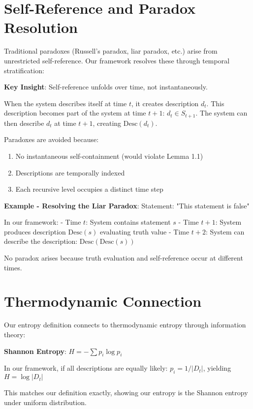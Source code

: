 \section{Self-Reference and Paradox Resolution}
\label{sec:ch01_axiom_and_derivation:self-reference-and-paradox-resolution}

Traditional paradoxes (Russell's paradox, liar paradox, etc.) arise from unrestricted self-reference. Our framework resolves these through temporal stratification:

\textbf{Key Insight}: Self-reference unfolds over time, not instantaneously.

When the system describes itself at time $t$, it creates description $d_t$.
This description becomes part of the system at time $t+1$: $d_t \in S_{t+1}$.
The system can then describe $d_t$ at time $t+1$, creating $\text{Desc}(d_t)$.

Paradoxes are avoided because:
\begin{enumerate}
\item No instantaneous self-containment (would violate Lemma 1.1)
\item Descriptions are temporally indexed
\item Each recursive level occupies a distinct time step
\end{enumerate}

\textbf{Example - Resolving the Liar Paradox}:
Statement: "This statement is false"

In our framework:
- Time $t$: System contains statement $s$
- Time $t+1$: System produces description $\text{Desc}(s)$ evaluating truth value
- Time $t+2$: System can describe the description: $\text{Desc}(\text{Desc}(s))$

No paradox arises because truth evaluation and self-reference occur at different times.

\section{Thermodynamic Connection}
\label{sec:ch01_axiom_and_derivation:thermodynamic-connection}

Our entropy definition connects to thermodynamic entropy through information theory:

\textbf{Shannon Entropy}: $H = -\sum p_i \log p_i$

In our framework, if all descriptions are equally likely:
$p_i = 1/|D_t|$, yielding $H = \log |D_t|$

This matches our definition exactly, showing our entropy is the Shannon entropy under uniform distribution.

